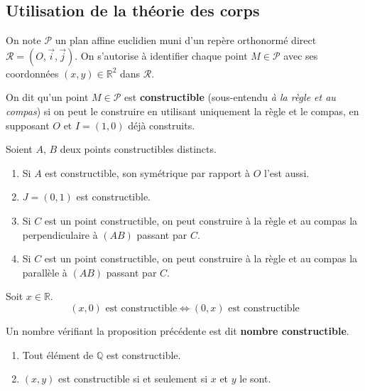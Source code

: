 	\subsection{Utilisation de la théorie des corps}
	
	
	On note $\mathcal{P}$ un plan affine euclidien muni d'un repère orthonormé direct $\mathcal{R} = (O, \overrightarrow{i}, \overrightarrow{j})$. On s'autorise à identifier chaque point $M \in \mathcal{P}$ avec ses coordonnées $(x,y) \in \mathbb{R}^2$ dans $\mathcal{R}$.
	
	\begin{definition}
		On dit qu'un point $M \in \mathcal{P}$ est \textbf{constructible} (sous-entendu \textit{à la règle et au compas}) si on peut le construire en utilisant uniquement la règle et le compas, en supposant $O$ et $I=(1,0)$ déjà construits.
	\end{definition}
	
	\begin{proposition}
		Soient $A$, $B$ deux points constructibles distincts.
		\begin{enumerate}[label=(\roman*)]
			\item Si $A$ est constructible, son symétrique par rapport à $O$ l'est aussi.
			\item $J = (0,1)$ est constructible.
			\item Si $C$ est un point constructible, on peut construire à la règle et au compas la perpendiculaire à $(AB)$ passant par $C$.
			\item Si $C$ est un point constructible, on peut construire à la règle et au compas la parallèle à $(AB)$ passant par $C$.
		\end{enumerate}
	\end{proposition}
	
	\begin{proposition}
		Soit $x \in \mathbb{R}$.
		\[ (x,0) \text{ est constructible} \iff (0,x) \text{ est constructible} \]
	\end{proposition}
	
	\begin{definition}
		Un nombre vérifiant la proposition précédente est dit \textbf{nombre constructible}.
	\end{definition}
	
	\begin{proposition}
		\begin{enumerate}[label=(\roman*)]
			\item Tout élément de $\mathbb{Q}$ est constructible.
			\item $(x,y)$ est constructible si et seulement si $x$ et $y$ le sont.
		\end{enumerate}
	\end{proposition}
	

